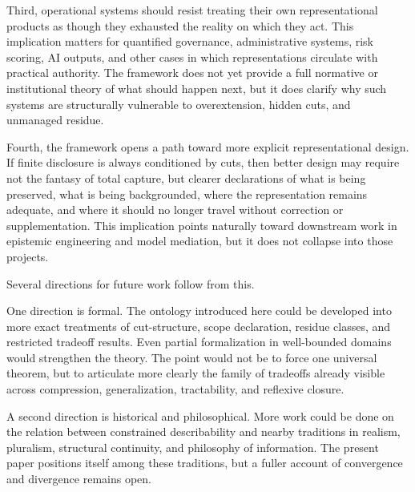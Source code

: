 \documentclass[11pt]{article}
\begin{document}
Third, operational systems should resist treating their own representational products as though they exhausted the reality on which they act. This implication matters for quantified governance, administrative systems, risk scoring, AI outputs, and other cases in which representations circulate with practical authority. The framework does not yet provide a full normative or institutional theory of what should happen next, but it does clarify why such systems are structurally vulnerable to overextension, hidden cuts, and unmanaged residue. \cite{espeland_stevens_quantification,porter_trust_in_numbers,scott_seeing_like_a_state,herd_moynihan_administrative_burden,nist_ai_rmf}

Fourth, the framework opens a path toward more explicit representational design. If finite disclosure is always conditioned by cuts, then better design may require not the fantasy of total capture, but clearer declarations of what is being preserved, what is being backgrounded, where the representation remains adequate, and where it should no longer travel without correction or supplementation. This implication points naturally toward downstream work in epistemic engineering and model mediation, but it does not collapse into those projects. \cite{mitchell_model_cards,gebru_datasheets,nist_ai_rmf,nist_explainable_ai}

Several directions for future work follow from this.

One direction is formal. The ontology introduced here could be developed into more exact treatments of cut-structure, scope declaration, residue classes, and restricted tradeoff results. Even partial formalization in well-bounded domains would strengthen the theory. The point would not be to force one universal theorem, but to articulate more clearly the family of tradeoffs already visible across compression, generalization, tractability, and reflexive closure. \cite{shannon_rate_distortion,geman_bias_variance,wolpert_no_free_lunch,arora_barak_complexity,bolander_self_reference_sep}

A second direction is historical and philosophical. More work could be done on the relation between constrained describability and nearby traditions in realism, pluralism, structural continuity, and philosophy of information. The present paper positions itself among these traditions, but a fuller account of convergence and divergence remains open. \cite{chakravartty_scientific_realism_sep,ladyman_structural_realism_sep,adriaans_information_sep,scientific_pluralism_sep}
\end{document}
